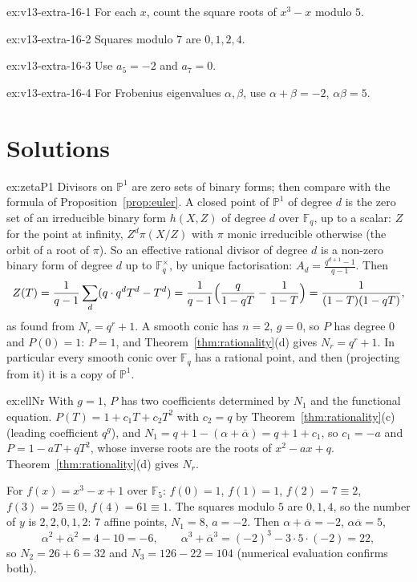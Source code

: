 \begin{hint}{ex:v13-extra-16-1}
For each $x$, count the square roots of $x^3-x$ modulo $5$.
\end{hint}

\begin{hint}{ex:v13-extra-16-2}
Squares modulo $7$ are $0,1,2,4$.
\end{hint}

\begin{hint}{ex:v13-extra-16-3}
Use $a_5=-2$ and $a_7=0$.
\end{hint}

\begin{hint}{ex:v13-extra-16-4}
For Frobenius eigenvalues $\alpha,\beta$, use $\alpha+\beta=-2$, $\alpha\beta=5$.
\end{hint}

\section{Solutions}

\begin{solution}{ex:zetaP1}
\idea Divisors on $\mathbb P^1$ are zero sets of binary forms; then compare with the formula of Proposition~\ref{prop:euler}.
\writeup A closed point of $\mathbb P^1$ of degree $d$ is the zero set of an irreducible binary form $h(X,Z)$ of degree $d$ over $\mathbb F_q$, up to a scalar:
$Z$ for the point at infinity, $Z^d\pi(X/Z)$ with $\pi$ monic irreducible otherwise (the orbit of a root of $\pi$). So an effective rational divisor of degree $d$ is a
non-zero binary form of degree $d$ up to $\mathbb F_q^\times$, by unique factorisation: $A_d=\frac{q^{d+1}-1}{q-1}$. Then
\[
Z(T)=\frac1{q-1}\sum_d(q\cdot q^dT^d-T^d)=\frac1{q-1}\Bigl(\frac q{1-qT}-\frac1{1-T}\Bigr)=\frac1{(1-T)(1-qT)},
\]
as found from $N_r=q^r+1$. A smooth conic has $n=2$, $g=0$, so $P$ has degree $0$ and $P(0)=1$: $P=1$, and Theorem~\ref{thm:rationality}(d) gives
$N_r=q^r+1$. In particular every smooth conic over $\mathbb F_q$ has a rational point, and then (projecting from it) it is a copy of $\mathbb P^1$.
\end{solution}

\begin{solution}{ex:ellNr}
\idea With $g=1$, $P$ has two coefficients determined by $N_1$ and the functional equation.
\writeup $P(T)=1+c_1T+c_2T^2$ with $c_2=q$ by Theorem~\ref{thm:rationality}(c) (leading coefficient $q^g$), and $N_1=q+1-(\alpha+\overline\alpha)=q+1+c_1$, so
$c_1=-a$ and $P=1-aT+qT^2$, whose inverse roots are the roots of $x^2-ax+q$. Theorem~\ref{thm:rationality}(d) gives $N_r$.

For $f(x)=x^3-x+1$ over $\mathbb F_5$: $f(0)=1$, $f(1)=1$, $f(2)=7\equiv2$, $f(3)=25\equiv0$, $f(4)=61\equiv1$. The squares modulo $5$ are $0,1,4$, so the number of $y$
is $2,2,0,1,2$: $7$ affine points, $N_1=8$, $a=-2$. Then $\alpha+\overline\alpha=-2$, $\alpha\overline\alpha=5$,
\[
\alpha^2+\overline\alpha^2=4-10=-6,\qquad\alpha^3+\overline\alpha^3=(-2)^3-3\cdot5\cdot(-2)=22,
\]
so $N_2=26+6=32$ and $N_3=126-22=104$ (numerical evaluation confirms both).
\end{solution}

